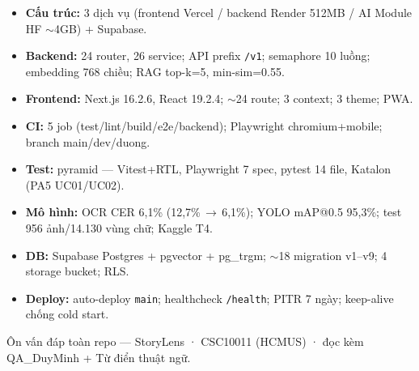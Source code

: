 \documentclass[11pt]{article}
\newcommand{\arr}{\,\ensuremath{\rightarrow}\,}
\newcommand{\code}[1]{\texttt{\small #1}}
\newcommand{\B}[1]{\textbf{#1}}
\begin{document}
\begin{sohoc}
\begin{itemize}
  \item \B{Cấu trúc:} 3 dịch vụ (frontend Vercel / backend Render 512MB / AI Module HF $\sim$4GB) + Supabase.
  \item \B{Backend:} 24 router, 26 service; API prefix \code{/v1}; semaphore 10 luồng; embedding 768 chiều; RAG top-k=5, min-sim=0.55.
  \item \B{Frontend:} Next.js 16.2.6, React 19.2.4; $\sim$24 route; 3 context; 3 theme; PWA.
  \item \B{CI:} 5 job (test/lint/build/e2e/backend); Playwright chromium+mobile; branch main/dev/duong.
  \item \B{Test:} pyramid --- Vitest+RTL, Playwright 7 spec, pytest 14 file, Katalon (PA5 UC01/UC02).
  \item \B{Mô hình:} OCR CER 6,1\% (12,7\%\arr6,1\%); YOLO mAP@0.5 95,3\%; test 956 ảnh/14.130 vùng chữ; Kaggle T4.
  \item \B{DB:} Supabase Postgres + pgvector + pg\_trgm; $\sim$18 migration v1--v9; 4 storage bucket; RLS.
  \item \B{Deploy:} auto-deploy \code{main}; healthcheck \code{/health}; PITR 7 ngày; keep-alive chống cold start.
\end{itemize}
\end{sohoc}

\vspace{6pt}
\begin{center}\small\color{soft}
Ôn vấn đáp toàn repo --- StoryLens · CSC10011 (HCMUS) · đọc kèm QA\_DuyMinh + Từ điển thuật ngữ.
\end{center}
\end{document}
